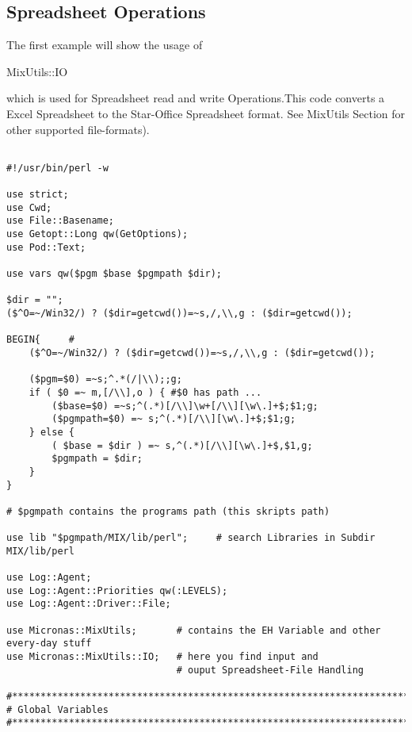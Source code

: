 \documentclass[a4paper,12pt]{article}
\begin{document}
\subsection{Spreadsheet Operations}
The first example will show the usage of  \begin{tt}MixUtils::IO\end{tt} which is used for Spreadsheet read and write Operations.This code converts a Excel Spreadsheet to the Star-Office Spreadsheet format. See MixUtils Section for other supported file-formats).
\begin{verbatim}

#!/usr/bin/perl -w

use strict;
use Cwd;
use File::Basename;
use Getopt::Long qw(GetOptions);
use Pod::Text;

use vars qw($pgm $base $pgmpath $dir);

$dir = "";
($^O=~/Win32/) ? ($dir=getcwd())=~s,/,\\,g : ($dir=getcwd());

BEGIN{     # 
    ($^O=~/Win32/) ? ($dir=getcwd())=~s,/,\\,g : ($dir=getcwd());    

    ($pgm=$0) =~s;^.*(/|\\);;g;
    if ( $0 =~ m,[/\\],o ) { #$0 has path ...
        ($base=$0) =~s;^(.*)[/\\]\w+[/\\][\w\.]+$;$1;g;
        ($pgmpath=$0) =~ s;^(.*)[/\\][\w\.]+$;$1;g;
    } else {
        ( $base = $dir ) =~ s,^(.*)[/\\][\w\.]+$,$1,g;
        $pgmpath = $dir;
    }
}

# $pgmpath contains the programs path (this skripts path)

use lib "$pgmpath/MIX/lib/perl";     # search Libraries in Subdir MIX/lib/perl

use Log::Agent;
use Log::Agent::Priorities qw(:LEVELS);
use Log::Agent::Driver::File;

use Micronas::MixUtils;       # contains the EH Variable and other every-day stuff
use Micronas::MixUtils::IO;   # here you find input and 
                              # ouput Spreadsheet-File Handling

#******************************************************************************
# Global Variables
#******************************************************************************


\end{verbatim}
\end{document}
